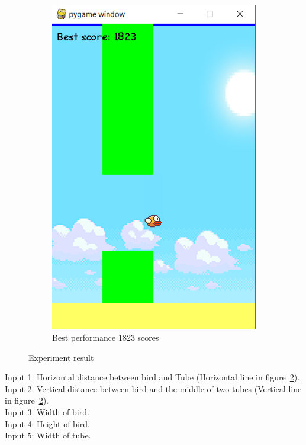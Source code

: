 \documentclass[conference]{IEEEtran}
\begin{document}
\begin{figure}[H]
    ~ %
    \begin{subfigure}[b]{0.2\textwidth}
        \includegraphics[width=\textwidth]{score1823}
        \caption{Best performance 1823 scores}
        \label{fig:fig7}
    \end{subfigure}
    \caption{Experiment result}
\end{figure}
\indent Input 1: Horizontal distance between bird and Tube (Horizontal line in figure~\ref{fig:fig7}).\\
\indent Input 2: Vertical distance between bird and the middle of two tubes (Vertical line in figure~\ref{fig:fig7}).\\
\indent Input 3: Width of bird.\\
\indent Input 4: Height of bird.\\
\indent Input 5: Width of tube.
\end{document}
